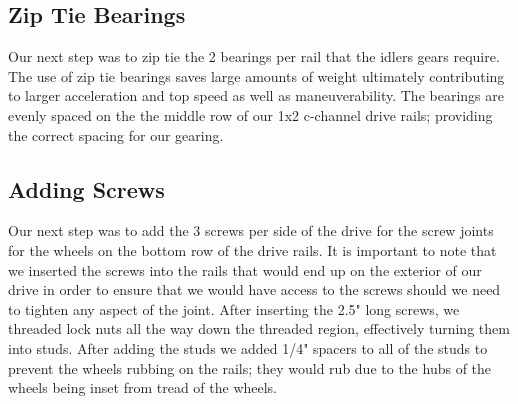 \subsection*{Zip Tie Bearings}
Our next step was to zip tie the 2 bearings per rail that the idlers gears require. The use of zip tie bearings saves large amounts of weight ultimately contributing to larger acceleration and top speed as well as maneuverability. The bearings are evenly spaced on the the middle row of our 1x2 c-channel drive rails; providing the correct spacing for our gearing.

\subsection*{Adding Screws}
Our next step was to add the 3 screws per side of the drive for the screw joints for the wheels on the bottom row of the drive rails. It is important to note that we inserted the screws into the rails that would end up on the exterior of our drive in order to ensure that we would have access to the screws should we need to tighten any aspect of the joint. After inserting the 2.5" long screws, we threaded lock nuts all the way down the threaded region, effectively turning them into studs. After adding the studs we added 1/4" spacers to all of the studs to prevent the wheels rubbing on the rails; they would rub due to the hubs of the wheels being inset from tread of the wheels.

